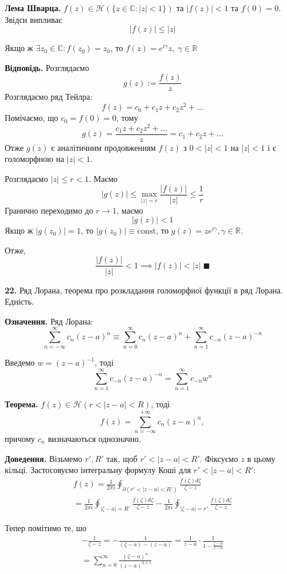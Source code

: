 \documentclass[14pt]{extarticle}
\begin{document}
\textbf{Лема Шварца.} $f(z) \in \mathcal{H}(\{z \in \mathbb{C}: |z|<1\})$ та $|f(z)| < 1$ та $f(0)=0$. Звідси випливає 
\[
|f(z)| \leq |z|
\]

Якщо ж $\exists z_0 \in \mathbb{C}: f(z_0)=z_0$, то $f(z) =e^{i\gamma}z, \; \gamma \in \mathbb{R}$

\textbf{Відповідь.} Розглядаємо
\[
g(z) := \frac{f(z)}{z}
\]
Розглядаємо ряд Тейлра:
\[
f(z) = c_0 + c_1 z + c_2z^2 + \dots 
\]
Помічаємо, що $c_0=f(0)=0$, тому
\[
g(z) = \frac{c_1z + c_2z^2+\dots}{z} = c_1+c_2z + \dots 
\]
Отже $g(z)$ є аналітичним продовженням $f(z)$ з $0<|z|<1$ на $|z|<1$ і є голоморфною на $|z|<1$.

Розглядаємо $|z| \leq r < 1$. Маємо
\[
|g(z)| \leq \max_{|z|=r}\frac{|f(z)|}{|z|} \leq \frac{1}{r}
\]
Гранично переходимо до $r \to 1$, маємо
\[
|g(z)| < 1
\]
Якщо ж $|g(z_0)|=1$, то $|g(z_0)|\equiv \text{const}$, то $g(z)=ze^{i\gamma},\gamma \in \mathbb{R}$. 

Отже, 
\[
\frac{|f(z)|}{|z|} < 1 \implies |f(z)| < |z|\; \blacksquare
\]

\textbf{22.} Ряд Лорана, теорема про розкладання голоморфної функції в ряд Лорана. Едність.

\textbf{Означення.} Ряд Лорана:
\[
\sum_{n=-\infty}^{\infty} c_n(z-a)^n \equiv \sum_{n=0}^{\infty}c_n(z-a)^{n} + \sum_{n=1}^{\infty}c_{-n}(z-a)^{-n}
\]

Введемо $w=(z-a)^{-1}$, тоді
\[
\sum_{n=1}^{\infty}c_{-n}(z-a)^{-n} = \sum_{n=1}^{\infty}c_{-n}w^n
\]

\textbf{Теорема.} $f(z) \in \mathcal{H}(r<|z-a|<R)$, тоді
\[
f(z) = \sum_{n=-\infty}^{+\infty} c_n(z-a)^n,
\]
причому $c_n$ визначаються однозначно.

\textbf{Доведення.} Візьмемо $r',R'$ так, щоб $r'<|z-a|<R'$. Фіксуємо $z$ в цьому кільці. Застосовуємо інтегральну формулу Коші для $r' < |z-a|<R'$:
\begin{gather*}
f(z) = \frac{1}{2\pi i}\oint_{\partial(r' < |z-a|<R')} \frac{f(\zeta)d\zeta}{\zeta-z} \\
= \frac{1}{2\pi i}\oint_{|\zeta-a|=R'} \frac{f(\zeta)d\zeta}{\zeta-z} - \frac{1}{2\pi i}\oint_{|\zeta-a|=r'} \frac{f(\zeta)d\zeta}{\zeta-z}
\end{gather*}

Тепер помітимо те, шо
\begin{gather*}
-\frac{1}{\zeta-z} = -\frac{1}{(\zeta-a)-(z-a)} = \frac{1}{z-a} \cdot \frac{1}{1-\frac{\zeta-a}{z-a}} \\
= \sum_{n=0}^{\infty} \frac{(\zeta-a)^n}{(z-a)^{n+1}}
\end{gather*}
\end{document}
